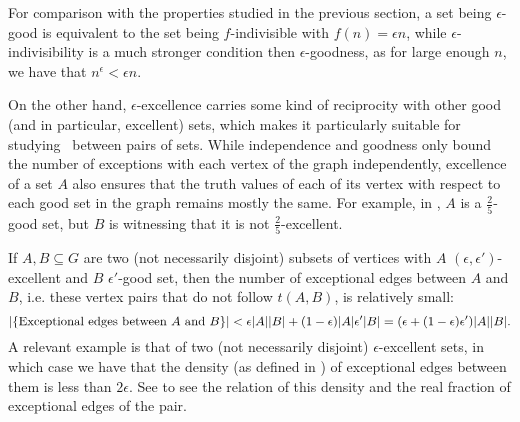         \begin{remark}
            For comparison with the properties studied in the previous section, a set being $\epsilon$-good is equivalent to the
            set being $f$-indivisible with $f(n) = \epsilon n$, while $\epsilon$-indivisibility is a much stronger condition then
            $\epsilon$-goodness, as for large enough $n$, we have that $n^\epsilon < \epsilon n$.

            On the other hand, $\epsilon$-excellence carries some kind of reciprocity with other good (and in particular,
            excellent) sets, which makes it particularly suitable for studying \regularity~between pairs of sets.
            While independence and goodness only bound the number of exceptions with each vertex of the graph independently,
            excellence of a set $A$ also ensures that the truth values of each of its vertex with respect to each
            good set in the graph remains mostly the same.
            For example, in , $A$ is a $\frac{2}{5}$-good set, but $B$ is witnessing
            that it is not $\frac{2}{5}$-excellent.
        \end{remark}

        \begin{remark} \label{rmk:excellence_imply_little_exceptions}
            If $A, B \subseteq G$ are two (not necessarily disjoint) subsets of vertices
            with $A$ $(\epsilon, \epsilon')$-excellent and $B$ $\epsilon'$-good set, then the number of exceptional edges between $A$ and $B$,
            i.e. these vertex pairs that do not follow $t(A,B)$, is relatively small:
            \[
                | \{ \text{Exceptional edges between } A \text{ and } B \} | <
                    \epsilon |A| |B| + (1- \epsilon) |A| \epsilon' |B| = ( \epsilon + ( 1-\epsilon ) \epsilon' ) |A| |B|.
            \]
            A relevant example is that of two (not necessarily disjoint) $\epsilon$-excellent sets, in which case we have that
            the density (as defined in ) of exceptional edges between them is less than $2\epsilon$.
            See  to see the relation of this density and the real fraction of exceptional
            edges of the pair.
        \end{remark}


